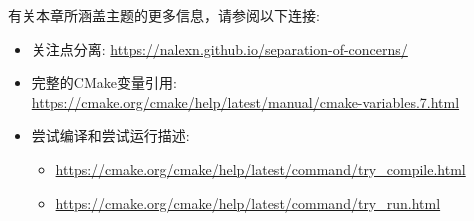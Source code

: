 

有关本章所涵盖主题的更多信息，请参阅以下连接:

\begin{itemize}
\item 
关注点分离: \url{https://nalexn.github.io/separation-of-concerns/}

\item 
完整的CMake变量引用: \url{https://cmake.org/cmake/help/latest/manual/cmake-variables.7.html}

\item 
尝试编译和尝试运行描述:
\begin{itemize}
\item 
\url{https://cmake.org/cmake/help/latest/command/try_compile.html}

\item 
\url{https://cmake.org/cmake/help/latest/command/try_run.html}
\end{itemize}
\end{itemize}
